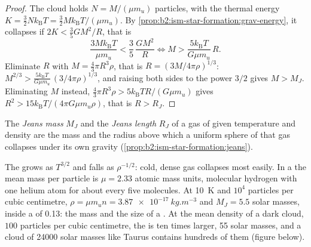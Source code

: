 \begin{proof}
The cloud holds $N = M/(\mu m_u)$ particles, with the thermal energy
$K = \tfrac32 N k_{\mathrm B}T = \tfrac32 M k_{\mathrm B}T/(\mu m_u)$. By
\cref{prop:b2:ism-star-formation:grav-energy}, it collapses if
$2K < \tfrac35 GM^2/R$, that is
\[
  \frac{3 M k_{\mathrm B} T}{\mu m_u} < \frac{3}{5}\,\frac{G M^2}{R}
  \iff M > \frac{5 k_{\mathrm B} T}{G \mu m_u}\, R .
\]
Eliminate $R$ with $M = \tfrac43\pi R^3\rho$, that is $R = (3M/4\pi\rho)^{1/3}$:
$M^{2/3} > \frac{5 k_{\mathrm B}T}{G\mu m_u}\,(3/4\pi\rho)^{1/3}$, and raising
both sides to the power $3/2$ gives $M > M_J$. Eliminating $M$ instead,
$\tfrac43\pi R^3\rho > 5 k_{\mathrm B}T R/(G\mu m_u)$ gives $R^2 > 15
k_{\mathrm B}T/(4\pi G\mu m_u\rho)$, that is $R > R_J$.
\end{proof}

\begin{definition}\label{def:b2:ism-star-formation:jeans}
The \emph{Jeans mass} $M_J$ and the \emph{Jeans
length} $R_J$ of a gas of given temperature and density
are the mass and the radius above which a uniform sphere of that gas
collapses under its own gravity (\cref{prop:b2:ism-star-formation:jeans}).
\end{definition}

The  grows as $T^{3/2}$ and falls as $\rho^{-1/2}$: cold, dense gas
collapses most easily. In a  the mean mass per particle is
$\mu = 2.33$ atomic mass units, molecular hydrogen with one helium atom for
about every five molecules. At \qty{10}{K} and $10^4$ particles per cubic
centimetre, $\rho = \mu m_u n = \qty{3.87e-17}{kg.m^{-3}}$ and
$M_J = 5.5$ solar masses, inside a  of \qty{0.13}{\parsec}:
the mass and the size of a . At the mean density of a dark cloud,
$100$ particles per cubic centimetre, the  is ten times larger, 55
solar masses, and a cloud of \num{24000} solar masses like Taurus contains
hundreds of them (figure below).


